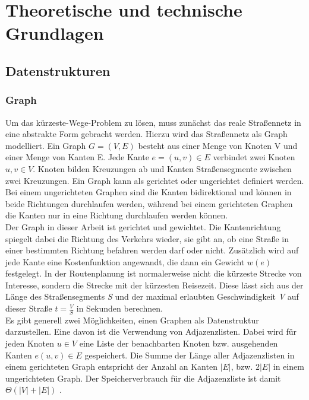 \section{Theoretische und technische Grundlagen}

\subsection{Datenstrukturen}
\subsubsection{Graph}
Um das kürzeste-Wege-Problem zu lösen, muss zunächst das reale Straßennetz in eine abstrakte Form
gebracht werden. Hierzu wird das Straßennetz als Graph modelliert. Ein Graph $G = (V,E)$ besteht aus
einer Menge von Knoten V und einer Menge von Kanten E. Jede Kante $e = (u,v)\in E$ verbindet zwei
Knoten $u,v \in V$. Knoten bilden Kreuzungen ab und Kanten Straßensegmente zwischen zwei Kreuzungen.
Ein Graph kann als gerichtet oder ungerichtet definiert werden. Bei einem ungerichteten  Graphen
sind die Kanten bidirektional und können in beide Richtungen durchlaufen werden, während bei einem
gerichteten Graphen die Kanten nur in eine Richtung durchlaufen werden können.\\

Der Graph in dieser Arbeit ist gerichtet und gewichtet. Die Kantenrichtung spiegelt dabei die
Richtung des Verkehrs wieder, \dH sie gibt an, ob eine Straße in einer bestimmten Richtung befahren
werden darf oder nicht. Zusätzlich wird auf jede Kante eine Kostenfunktion angewandt, die dann ein
Gewicht $w(e)$ festgelegt. In der Routenplanung ist normalerweise nicht die kürzeste Strecke von
Interesse, sondern die Strecke mit der kürzesten Reisezeit. Diese lässt sich aus der
Länge des Straßensegments \emph{S} und der maximal erlaubten Geschwindigkeit \emph{V} auf dieser
Straße $t = \frac{V}{S}$ in Sekunden berechnen.\\

Es gibt generell zwei Möglichkeiten, einen Graphen als Datenstruktur darzustellen. Eine davon ist
die Verwendung von Adjazenzlisten. Dabei wird für jeden Knoten $u \in V$ eine Liste der benachbarten
Knoten bzw. ausgehenden Kanten $e(u,v) \in E$ gespeichert. Die Summe der Länge aller Adjazenzlisten
in einem gerichteten Graph entspricht der Anzahl an Kanten $|E|$, bzw. $2|E|$ in einem ungerichteten
Graph. Der Speicherverbrauch für die Adjazenzliste ist damit $\Theta(|V| + |E|)$ \cite{intro.algo}.

